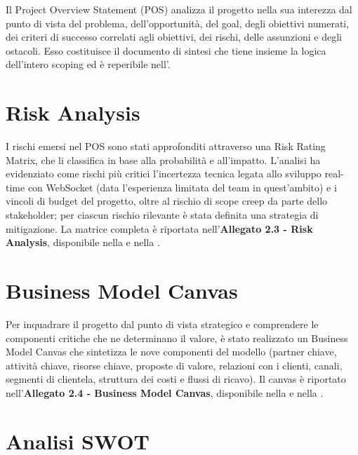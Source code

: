 Il Project Overview Statement (POS) analizza il progetto nella sua interezza dal punto di vista del problema, dell'opportunità, del goal, degli obiettivi numerati, dei criteri di successo correlati agli obiettivi, dei rischi, delle assunzioni e degli ostacoli. Esso costituisce il documento di sintesi che tiene insieme la logica dell'intero scoping ed è reperibile nell'.

\section{Risk Analysis}

I rischi emersi nel POS sono stati approfonditi attraverso una Risk Rating Matrix, che li classifica in base alla probabilità e all'impatto. L'analisi ha evidenziato come rischi più critici l'incertezza tecnica legata allo sviluppo real-time con WebSocket (data l'esperienza limitata del team in quest'ambito) e i vincoli di budget del progetto, oltre al rischio di scope creep da parte dello stakeholder; per ciascun rischio rilevante è stata definita una strategia di mitigazione. La matrice completa è riportata nell'\textbf{Allegato 2.3 - Risk Analysis}, disponibile nella  e nella .

\section{Business Model Canvas}

Per inquadrare il progetto dal punto di vista strategico e comprendere le componenti critiche che ne determinano il valore, è stato realizzato un Business Model Canvas che sintetizza le nove componenti del modello (partner chiave, attività chiave, risorse chiave, proposte di valore, relazioni con i clienti, canali, segmenti di clientela, struttura dei costi e flussi di ricavo). Il canvas è riportato nell'\textbf{Allegato 2.4 - Business Model Canvas}, disponibile nella  e nella .

\section{Analisi SWOT}

